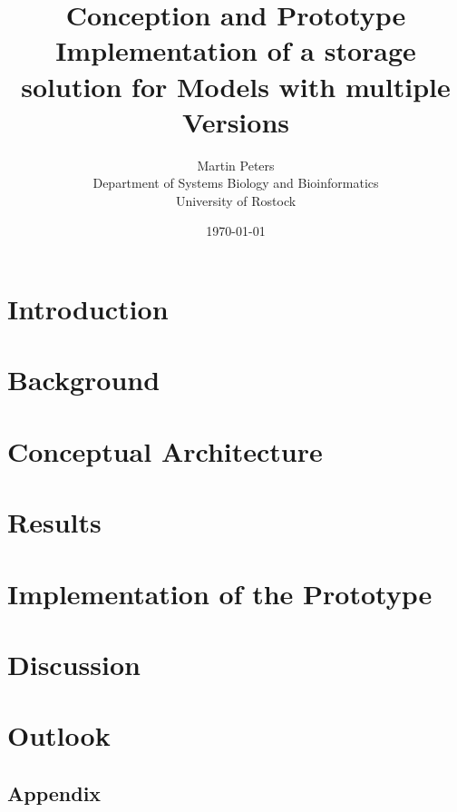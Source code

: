\documentclass[12pt, a4paper, titlepage]{book}
\title{Conception and Prototype Implementation of a storage solution for Models with multiple Versions}
\author{Martin Peters\\[12pt]
	\small Department of Systems Biology and Bioinformatics\\
	\small University of Rostock}
\date{\today}
\begin{document}
	\maketitle
	\tableofcontents
	
	\chapter{Introduction}
	
	
	\chapter{Background}
	
	
	\chapter{Conceptual Architecture}
	
	
	\chapter{Results}
	
	
	\chapter{Implementation of the Prototype}
	
	
	\chapter{Discussion}
	
	
	\chapter{Outlook}
	
	
	
	
	
	\begin{appendix}
		\listoffigures
		
		\chapter*{Appendix}
	\end{appendix}
\end{document}
